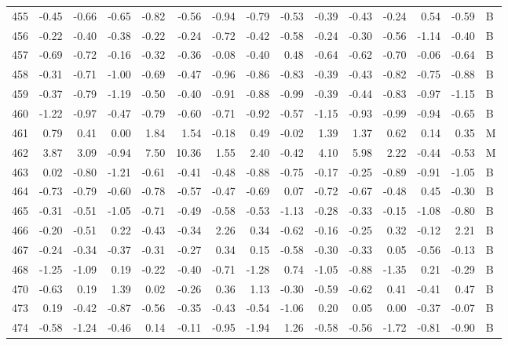 \begin{table}[ht]
\begin{tabular}{rrrrrrrrrrrrrrl}
  455 & -0.45 & -0.66 & -0.65 & -0.82 & -0.56 & -0.94 & -0.79 & -0.53 & -0.39 & -0.43 & -0.24 & 0.54 & -0.59 & B \\ 
  456 & -0.22 & -0.40 & -0.38 & -0.22 & -0.24 & -0.72 & -0.42 & -0.58 & -0.24 & -0.30 & -0.56 & -1.14 & -0.40 & B \\ 
  457 & -0.69 & -0.72 & -0.16 & -0.32 & -0.36 & -0.08 & -0.40 & 0.48 & -0.64 & -0.62 & -0.70 & -0.06 & -0.64 & B \\ 
  458 & -0.31 & -0.71 & -1.00 & -0.69 & -0.47 & -0.96 & -0.86 & -0.83 & -0.39 & -0.43 & -0.82 & -0.75 & -0.88 & B \\ 
  459 & -0.37 & -0.79 & -1.19 & -0.50 & -0.40 & -0.91 & -0.88 & -0.99 & -0.39 & -0.44 & -0.83 & -0.97 & -1.15 & B \\ 
  460 & -1.22 & -0.97 & -0.47 & -0.79 & -0.60 & -0.71 & -0.92 & -0.57 & -1.15 & -0.93 & -0.99 & -0.94 & -0.65 & B \\ 
  461 & 0.79 & 0.41 & 0.00 & 1.84 & 1.54 & -0.18 & 0.49 & -0.02 & 1.39 & 1.37 & 0.62 & 0.14 & 0.35 & M \\ 
  462 & 3.87 & 3.09 & -0.94 & 7.50 & 10.36 & 1.55 & 2.40 & -0.42 & 4.10 & 5.98 & 2.22 & -0.44 & -0.53 & M \\ 
  463 & 0.02 & -0.80 & -1.21 & -0.61 & -0.41 & -0.48 & -0.88 & -0.75 & -0.17 & -0.25 & -0.89 & -0.91 & -1.05 & B \\ 
  464 & -0.73 & -0.79 & -0.60 & -0.78 & -0.57 & -0.47 & -0.69 & 0.07 & -0.72 & -0.67 & -0.48 & 0.45 & -0.30 & B \\ 
  465 & -0.31 & -0.51 & -1.05 & -0.71 & -0.49 & -0.58 & -0.53 & -1.13 & -0.28 & -0.33 & -0.15 & -1.08 & -0.80 & B \\ 
  466 & -0.20 & -0.51 & 0.22 & -0.43 & -0.34 & 2.26 & 0.34 & -0.62 & -0.16 & -0.25 & 0.32 & -0.12 & 2.21 & B \\ 
  467 & -0.24 & -0.34 & -0.37 & -0.31 & -0.27 & 0.34 & 0.15 & -0.58 & -0.30 & -0.33 & 0.05 & -0.56 & -0.13 & B \\ 
  468 & -1.25 & -1.09 & 0.19 & -0.22 & -0.40 & -0.71 & -1.28 & 0.74 & -1.05 & -0.88 & -1.35 & 0.21 & -0.29 & B \\ 
  470 & -0.63 & 0.19 & 1.39 & 0.02 & -0.26 & 0.36 & 1.13 & -0.30 & -0.59 & -0.62 & 0.41 & -0.41 & 0.47 & B \\ 
  473 & 0.19 & -0.42 & -0.87 & -0.56 & -0.35 & -0.43 & -0.54 & -1.06 & 0.20 & 0.05 & 0.00 & -0.37 & -0.07 & B \\ 
  474 & -0.58 & -1.24 & -0.46 & 0.14 & -0.11 & -0.95 & -1.94 & 1.26 & -0.58 & -0.56 & -1.72 & -0.81 & -0.90 & B \\ 

\end{tabular}
\end{table}
